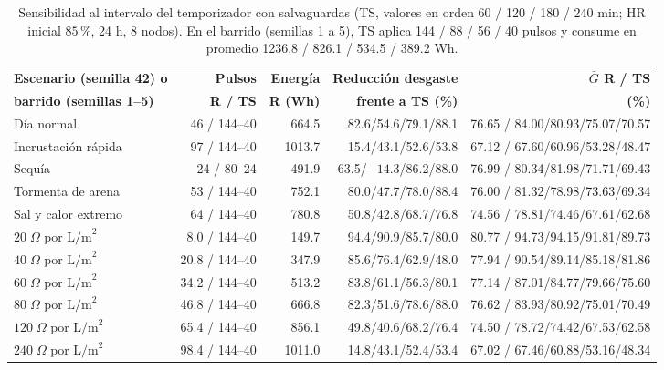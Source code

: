 \begin{table}[htbp]
\centering
\footnotesize
\setlength{\tabcolsep}{2pt}
\caption{Sensibilidad al intervalo del temporizador con salvaguardas (TS, valores en orden 60 / 120 / 180 / 240 min; HR inicial $85\,\%$, 24 h, 8 nodos). En el barrido (semillas 1 a 5), TS aplica 144 / 88 / 56 / 40 pulsos y consume en promedio 1236.8 / 826.1 / 534.5 / 389.2 Wh.}
\label{tab:sensibilidad_intervalo}
\begin{tabular*}{\textwidth}{@{\extracolsep{\fill}}lrrrr@{}}
\toprule
\textbf{Escenario (semilla 42) o} & \textbf{Pulsos} & \textbf{Energ\'ia} & \textbf{Reducci\'on desgaste} & \textbf{$\bar{G}$ R / TS} \\
\textbf{barrido (semillas 1--5)} & \textbf{R / TS} & \textbf{R (Wh)} & \textbf{frente a TS (\%)} & \textbf{(\%)} \\
\midrule
D\'ia normal & 46 / 144--40 & 664.5 & 82.6/54.6/79.1/88.1 & 76.65 / 84.00/80.93/75.07/70.57 \\
Incrustaci\'on r\'apida & 97 / 144--40 & 1013.7 & 15.4/43.1/52.6/53.8 & 67.12 / 67.60/60.96/53.28/48.47 \\
Sequ\'ia & 24 / 80--24 & 491.9 & 63.5/$-14.3$/86.2/88.0 & 76.99 / 80.34/81.98/71.71/69.43 \\
Tormenta de arena & 53 / 144--40 & 752.1 & 80.0/47.7/78.0/88.4 & 76.00 / 81.32/78.98/73.63/69.34 \\
Sal y calor extremo & 64 / 144--40 & 780.8 & 50.8/42.8/68.7/76.8 & 74.56 / 78.81/74.46/67.61/62.68 \\
\midrule
$20\;\Omega\text{ por L/m}^2$ & 8.0 / 144--40 & 149.7 & 94.4/90.9/85.7/80.0 & 80.77 / 94.73/94.15/91.81/89.73 \\
$40\;\Omega\text{ por L/m}^2$ & 20.8 / 144--40 & 347.9 & 85.6/76.4/62.9/48.0 & 77.94 / 90.54/89.14/85.18/81.86 \\
$60\;\Omega\text{ por L/m}^2$ & 34.2 / 144--40 & 513.2 & 83.8/61.1/56.3/80.1 & 77.14 / 87.01/84.77/79.66/75.60 \\
$80\;\Omega\text{ por L/m}^2$ & 46.8 / 144--40 & 666.8 & 82.3/51.6/78.6/88.0 & 76.62 / 83.93/80.92/75.01/70.49 \\
$120\;\Omega\text{ por L/m}^2$ & 65.4 / 144--40 & 856.1 & 49.8/40.6/68.2/76.4 & 74.50 / 78.72/74.42/67.53/62.58 \\
$240\;\Omega\text{ por L/m}^2$ & 98.4 / 144--40 & 1011.0 & 14.8/43.1/52.4/53.4 & 67.02 / 67.46/60.88/53.16/48.34 \\
\bottomrule
\end{tabular*}
\end{table}

